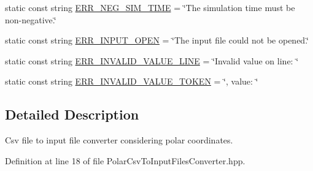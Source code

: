 \begin{DoxyCompactItemize}
\item 
static const string \hyperlink{classmultiscale_1_1video_1_1PolarCsvToInputFilesConverter_aebefa6d5430519fc12081470ea4c1ae9}{\-E\-R\-R\-\_\-\-N\-E\-G\-\_\-\-S\-I\-M\-\_\-\-T\-I\-M\-E} = \char`\"{}\-The simulation time must be non-\/negative.\char`\"{}
\item 
static const string \hyperlink{classmultiscale_1_1video_1_1PolarCsvToInputFilesConverter_a4997621ae07f6696b1f0ec3cb11bbaeb}{\-E\-R\-R\-\_\-\-I\-N\-P\-U\-T\-\_\-\-O\-P\-E\-N} = \char`\"{}\-The input file could not be opened.\char`\"{}
\item 
static const string \hyperlink{classmultiscale_1_1video_1_1PolarCsvToInputFilesConverter_aedff7359498b5b318d113a83d37e6450}{\-E\-R\-R\-\_\-\-I\-N\-V\-A\-L\-I\-D\-\_\-\-V\-A\-L\-U\-E\-\_\-\-L\-I\-N\-E} = \char`\"{}\-Invalid value on line\-: \char`\"{}
\item 
static const string \hyperlink{classmultiscale_1_1video_1_1PolarCsvToInputFilesConverter_aa8f1c11b3df77f715af4202dfd2c308b}{\-E\-R\-R\-\_\-\-I\-N\-V\-A\-L\-I\-D\-\_\-\-V\-A\-L\-U\-E\-\_\-\-T\-O\-K\-E\-N} = \char`\"{}, value\-: \char`\"{}
\end{DoxyCompactItemize}


\subsection{\-Detailed \-Description}
\-Csv file to input file converter considering polar coordinates. 

\-Definition at line 18 of file \-Polar\-Csv\-To\-Input\-Files\-Converter.\-hpp.



